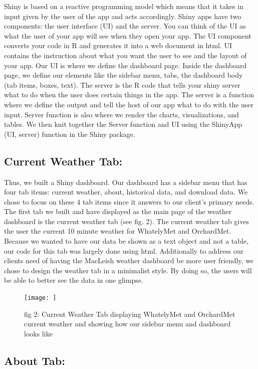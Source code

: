 \documentclass[10pt,letterpaper]{article}
\begin{document}
Shiny is based on a reactive programming model which means that it takes
in input given by the user of the app and acts accordingly. Shiny apps
have two components: the user interface (UI) and the server. You can
think of the UI as what the user of your app will see when they open
your app. The UI component converts your code in R and generates it into
a web document in html. UI contains the instruction about what you want
the user to see and the layout of your app. Our UI is where we define
the dashboard page. Inside the dashboard page, we define our elements
like the sidebar menu, tabs, the dashboard body (tab items, boxes,
text). The server is the R code that tells your shiny server what to do
when the user does certain things in the app. The server is a function
where we define the output and tell the host of our app what to do with
the user input. Server function is also where we render the charts,
visualizations, and tables. We then knit together the Server function
and UI using the ShinyApp (UI, server) function in the Shiny package.

\subsection{Current Weather Tab:}\label{current-weather-tab}

Thus, we built a Shiny dashboard. Our dashboard has a sidebar menu that
has four tab items: current weather, about, historical data, and
download data. We chose to focus on these 4 tab items since it answers
to our client's primary needs. The first tab we built and have displayed
as the main page of the weather dashboard is the current weather tab
(see fig. 2). The current weather tab gives the user the current 10
minute weather for WhatelyMet and OrchardMet. Because we wanted to have
our data be shown as a text object and not a table, our code for this
tab was largely done using html. Additionally to address our clients
need of having the MacLeish weather dashboard be more user friendly, we
chose to design the weather tab in a minimalist style. By doing so, the
users will be able to better see the data in one glimpse.

\begin{figure}
\texttt{[image: ]} \caption{fig 2: Current Weather Tab displaying WhatelyMet and OrchardMet current weather and showing how our sidebar menu and dashboard looks like}\label{fig:unnamed-chunk-2}
\end{figure}

\subsection{About Tab:}\label{about-tab}
\end{document}
